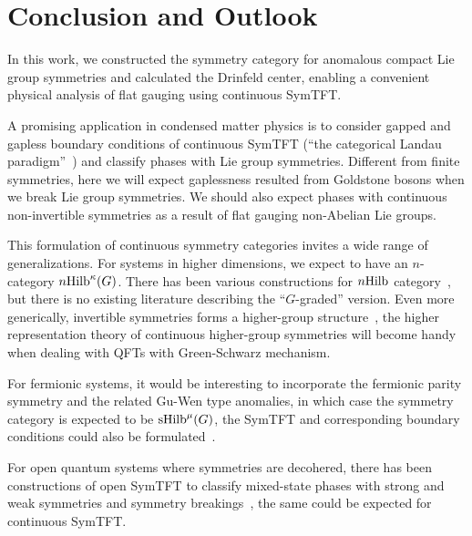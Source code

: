 \documentclass[a4paper,11pt]{article}
\def\hilb{{\rm Hilb}}
\begin{document}
\section{Conclusion and Outlook}\label{sec:outlook}
In this work, we constructed the symmetry category for anomalous compact Lie group symmetries and calculated the Drinfeld center, enabling a convenient physical analysis of flat gauging using continuous SymTFT.

A promising application in condensed matter physics is to consider gapped and gapless boundary conditions of continuous SymTFT (``the categorical Landau paradigm''~\cite{Bhardwaj:2023fca,Bhardwaj:2023bbf}) and classify phases with Lie group symmetries. Different from finite symmetries, here we will expect gaplessness resulted from Goldstone bosons when we break Lie group symmetries. We should also expect phases with continuous non-invertible symmetries as a result of flat gauging non-Abelian Lie groups.

This formulation of continuous symmetry categories invites a wide range of generalizations. For systems in higher dimensions, we expect to have an $n$-category $n\hilb^\kappa(G)$. There has been various constructions for $n\hilb$ category~\cite{Baez:1995xq,Baez:2008hz}, but there is no existing literature describing the ``$G$-graded'' version. Even more generically, invertible symmetries forms a higher-group structure~\cite{Gaiotto:2014kfa,Cordova:2018cvg,Liu:2024znj}, the higher representation theory of continuous higher-group symmetries will become handy when dealing with QFTs with Green-Schwarz mechanism.

For fermionic systems, it would be interesting to incorporate the fermionic parity symmetry and the related Gu-Wen type anomalies, in which case the symmetry category is expected to be ${\rm sHilb}^\mu(G)$, the SymTFT and corresponding boundary conditions could also be formulated~\cite{Bhardwaj:2024ydc,Wen:2024udn}.

For open quantum systems where symmetries are decohered, there has been constructions of open SymTFT to classify mixed-state phases with strong and weak symmetries and symmetry breakings~\cite{Luo:2025phx,Schafer-Nameki:2025fiy,Qi:2025tal}, the same could be expected for continuous SymTFT.
\end{document}
